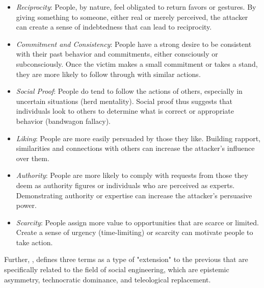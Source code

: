 \begin{itemize}
    \item \textit{Reciprocity}: People, by nature, feel obligated to return favors or gestures. By giving something to someone, either real or merely perceived, the attacker can create a sense of indebtedness that can lead to reciprocity.

    \item \textit{Commitment and Consistency}: People have a strong desire to be consistent with their past behavior and commitments, either consciously or subconsciously. Once the victim makes a small commitment or takes a stand, they are more likely to follow through with similar actions. %

    \item \textit{Social Proof}: People do tend to follow the actions of others, especially in uncertain situations (herd mentality). Social proof thus suggests that individuals look to others to determine what is correct or appropriate behavior (bandwagon fallacy).%

    \item \textit{Liking}: People are more easily persuaded by those they like. Building rapport, similarities and connections with others can increase the attacker's influence over them. %

    \item \textit{Authority}: People are more likely to comply with requests from those they deem as authority figures or individuals who are perceived as experts. Demonstrating authority or expertise can increase the attacker's persuasive power.

    \item \textit{Scarcity}: People assign more value to opportunities that are scarce or limited. Create a sense of urgency (time-limiting) or scarcity can motivate people to take action.
\end{itemize}

Further, \cite{hatfieldSocialEngineeringCybersecurity2018a}, defines three terms as a type of "extension" to the previous that are specifically related to the field of social engineering, which are epistemic asymmetry, technocratic dominance, and teleological replacement.

